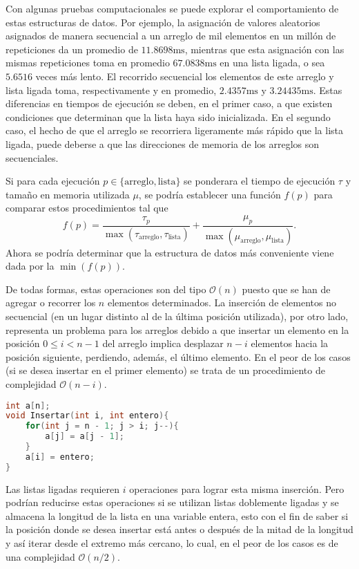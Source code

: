 \documentclass[paper=leter, fontsize=11pt]{scrartcl}
\numberwithin{equation}{section}		%
\numberwithin{figure}{section}			%
\numberwithin{table}{section}				%
\begin{document}
Con algunas pruebas computacionales se puede explorar el comportamiento de estas estructuras de datos. Por ejemplo, la asignación de valores aleatorios asignados de manera secuencial a un arreglo de mil elementos en un millón de repeticiones da un promedio de $11.8698 \text{ms}$, mientras que esta asignación con las mismas repeticiones toma en promedio $67.0838 \text{ms}$ en una lista ligada, o sea $5.6516$ veces más lento. El recorrido secuencial los elementos de este arreglo y lista ligada toma, respectivamente y en promedio, $2.4357 \text{ms}$ y $3.24435 \text{ms}$. Estas diferencias en tiempos de ejecución se deben, en el primer caso, a que existen condiciones que determinan que la lista haya sido inicializada. En el segundo caso, el hecho de que el arreglo se recorriera ligeramente más rápido que la lista ligada, puede deberse a que las direcciones de memoria de los arreglos son secuenciales.

Si para cada ejecución $p \in \{\text{arreglo}, \text{lista}\}$ se ponderara el tiempo de ejecución $\tau$ y tamaño en memoria utilizada $\mu$, se podría establecer una función $f(p)$ para comparar estos procedimientos tal que 
$$f(p) = \frac{\tau_p}{\max(\tau_{\text{arreglo}}, \tau_{\text{lista}})} + \frac{\mu_p}{\max(\mu_{\text{arreglo}}, \mu_{\text{lista}})}.$$ 
Ahora se podría determinar que la estructura de datos más conveniente viene dada por la $\min(f(p))$.

De todas formas, estas operaciones son del tipo $\mathcal{O}(n)$ puesto que se han de agregar o recorrer los $n$ elementos determinados. La inserción de elementos no secuencial (en un lugar distinto al de la última posición utilizada), por otro lado, representa un problema para los arreglos debido a que insertar un elemento en la posición $0 \leq i < n - 1$ del arreglo implica desplazar $n - i$ elementos hacia la posición siguiente, perdiendo, además, el último elemento. En el peor de los casos (si se desea insertar en el primer elemento) se trata de un procedimiento de complejidad $\mathcal{O}(n - i)$.\nocite{listas}

\begin{lstlisting}[language=C++, caption=Función para insertar un entero en la posición $i$ de un arreglo de $n$ elementos.]
int a[n];
void Insertar(int i, int entero){
	for(int j = n - 1; j > i; j--){
		a[j] = a[j - 1];
	}
	a[i] = entero;
}
\end{lstlisting}

Las listas ligadas requieren $i$ operaciones para lograr esta misma inserción. Pero podrían reducirse estas operaciones si se utilizan listas doblemente ligadas y se almacena la longitud de la lista en una variable entera, esto con el fin de saber si la posición donde se desea insertar está antes o después de la mitad de la longitud y así iterar desde el extremo más cercano, lo cual, en el peor de los casos es de una complejidad $\mathcal{O}(n / 2)$.
\end{document}
